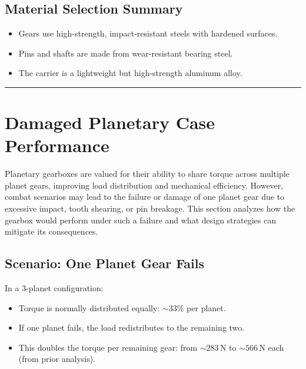 \documentclass[a4paper,12pt]{article}
\begin{document}
\subsection*{Material Selection Summary}
\begin{itemize}
    \item Gears use high-strength, impact-resistant steels with hardened surfaces.
    \item Pins and shafts are made from wear-resistant bearing steel.
    \item The carrier is a lightweight but high-strength aluminum alloy.
\end{itemize}

\vspace{1em}
\noindent\rule{\linewidth}{0.6pt}
\vspace{1em}


\section{Damaged Planetary Case Performance} \label{sec:damage}

Planetary gearboxes are valued for their ability to share torque across multiple planet gears, improving load distribution and mechanical efficiency. However, combat scenarios may lead to the failure or damage of one planet gear due to excessive impact, tooth shearing, or pin breakage. This section analyzes how the gearbox would perform under such a failure and what design strategies can mitigate its consequences.

\subsection*{Scenario: One Planet Gear Fails}

In a 3-planet configuration:
\begin{itemize}
    \item Torque is normally distributed equally: \( \sim 33\% \) per planet.
    \item If one planet fails, the load redistributes to the remaining two.
    \item This doubles the torque per remaining gear: from \( \sim283 \, \text{N} \) to \( \sim566 \, \text{N} \) each (from prior analysis).
\end{itemize}
\end{document}
